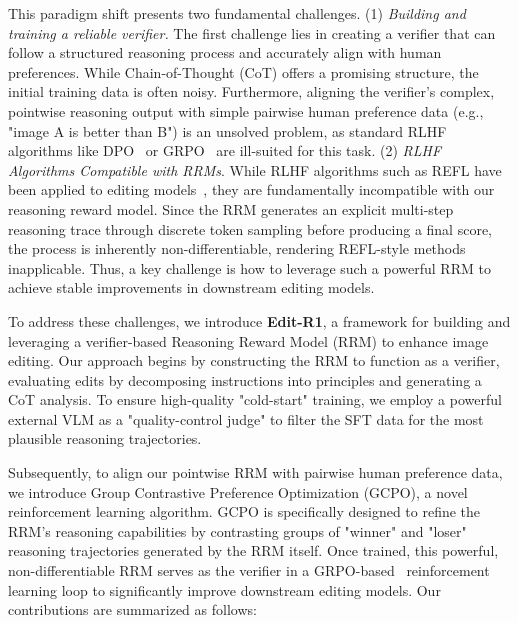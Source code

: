 This paradigm shift presents two fundamental challenges.
 (1) \textit{Building and training a reliable verifier.} The first challenge lies in creating a verifier that can follow a structured reasoning process and accurately align with human preferences. While Chain-of-Thought (CoT) offers a promising structure, the initial training data is often noisy. Furthermore, aligning the verifier's complex, pointwise reasoning output with simple pairwise human preference data (e.g., "image A is better than B") is an unsolved problem, as standard RLHF algorithms like DPO~\cite{rafailov2023direct} or GRPO~\cite{guo2025deepseek} are ill-suited for this task.
 (2) \textit{RLHF Algorithms Compatible with RRMs}. While RLHF algorithms such as REFL have been applied to editing models~\citep{gong2025onereward,ren2024byteedit}, they are fundamentally incompatible with our reasoning reward model. Since the RRM generates an explicit multi-step reasoning trace through discrete token sampling before producing a final score, the process is inherently non-differentiable, rendering REFL-style methods inapplicable. Thus, a key challenge is how to leverage such a powerful RRM to achieve stable improvements in downstream editing models.


To address these challenges, we introduce \textbf{Edit-R1}, a framework for building and leveraging a verifier-based Reasoning Reward Model (RRM) to enhance image editing. Our approach begins by constructing the RRM to function as a verifier, evaluating edits by decomposing instructions into principles and generating a CoT analysis. To ensure high-quality "cold-start" training, we employ a powerful external VLM as a "quality-control judge" to filter the SFT data for the most plausible reasoning trajectories.

Subsequently, to align our pointwise RRM with pairwise human preference data, we introduce Group Contrastive Preference Optimization (GCPO), a novel reinforcement learning algorithm. 
GCPO is specifically designed to refine the RRM's reasoning capabilities by contrasting groups of "winner" and "loser" reasoning trajectories generated by the RRM itself. Once trained, this powerful, non-differentiable RRM serves as the verifier in a GRPO-based~\citep{xue2025dancegrpo, liu2025flow} reinforcement learning loop to significantly improve downstream editing models. Our contributions are summarized as follows:


